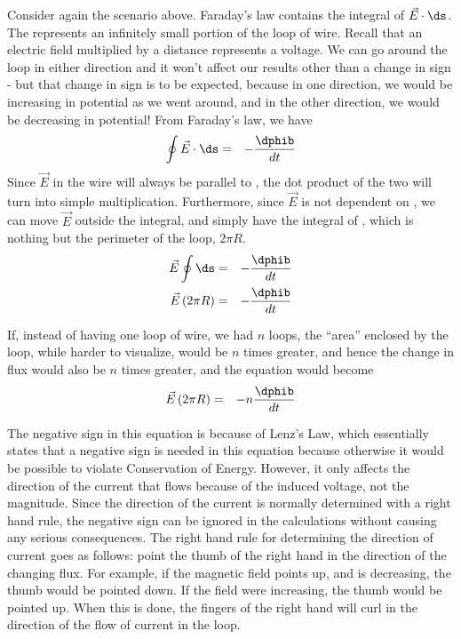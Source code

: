 \documentclass[12pt]{article}
\begin{document}
Consider again the scenario above. Faraday's law contains the integral of $\vec{E}\cdot\ds$. The \ds represents an infinitely small portion of the loop of wire. Recall that an electric field multiplied by a distance represents a voltage. We can go around the loop in either direction and it won't affect our results other than a change in sign - but that change in sign is to be expected, because in one direction, we would be increasing in potential as we went around, and in the other direction, we would be decreasing in potential! From Faraday's law, we have
\begin{eqnarray*}
\oint{\vec{E}\cdot\ds}&=&-\frac{\dphib}{dt}\\
\end{eqnarray*}
Since $\vec{E}$ in the wire will always be parallel to \ds, the dot product of the two will turn into simple multiplication. Furthermore, since $\vec{E}$ is not dependent on \ds, we can move $\vec{E}$ outside the integral, and simply have the integral of \ds, which is nothing but the perimeter of the loop, $2\pi R$. 
\begin{eqnarray*}
\vec{E}\oint{\ds}&=&-\frac{\dphib}{dt}\\
\vec{E}\left(2\pi R\right)&=&-\frac{\dphib}{dt}
\end{eqnarray*}

If, instead of having one loop of wire, we had $n$ loops, the ``area'' enclosed by the loop, while harder to visualize, would be $n$ times greater, and hence the change in flux would also be $n$ times greater, and the equation would become
\begin{eqnarray*}
\vec{E}\left(2\pi R\right)&=&-n\frac{\dphib}{dt}
\end{eqnarray*}

The negative sign in this equation is because of Lenz's Law, which essentially states that a negative sign is needed in this equation because otherwise it would be possible to violate Conservation of Energy. However, it only affects the direction of the current that flows because of the induced voltage, not the magnitude. Since the direction of the current is normally determined with a right hand rule, the negative sign can be ignored in the calculations without causing any serious consequences. The right hand rule for determining the direction of current goes as follows: point the thumb of the right hand in the direction of the changing flux. For example, if the magnetic field points up, and is decreasing, the thumb would be pointed down. If the field were increasing, the thumb would be pointed up. When this is done, the fingers of the right hand will curl in the direction of the flow of current in the loop.
\end{document}
